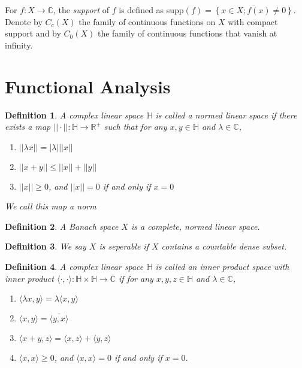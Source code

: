 \documentclass[12pt]{report}
\newtheorem{definition}{Definition}
\numberwithin{definition}{section}
\begin{document}
For $ f : X \to \mathbb{C} $, the \textit{support} of $f$ is defined as supp$(f) = \overline{\left\{ x \in X; f(x) \not = 0 \right\}} $.
Denote by $C_{c}(X)$ the family of continuous functions on $X$ with compact support and by $C_{0}(X)$ the family of continuous functions that vanish at infinity.


\break



\section{Functional Analysis}

\begin{definition}
A complex linear space $\mathbb{H}$ is called a \textit{normed linear space} if there exists a map $|| \cdot || : \mathbb{H} \to \mathbb{R}^{+} $ such that for any $x, y \in \mathbb{H}$ and $ \lambda \in \mathbb{C}$,

\begin{enumerate}
  \item $|| \lambda x || = |\lambda| || x ||$
  \item $|| x + y || \leq || x || + || y ||  $
  \item $|| x || \geq 0$, and $|| x || = 0$ if and only if $x = 0$
\end{enumerate}

We call this map a norm
\end{definition}

\begin{definition}
  A Banach space $X$ is a complete, normed linear space.
\end{definition}

\begin{definition}
  We say $X$ is seperable if $X$ contains a countable dense subset.
\end{definition}

\begin{definition}
  A complex linear space $\mathbb{H}$ is called an inner product space with inner product $ \langle \cdot, \cdot \rangle  : \mathbb{H} \times \mathbb{H} \to \mathbb{C} $ if for any $x,y,z \in \mathbb{H}$ and $\lambda \in \mathbb{C}$,
  \begin{enumerate}
    \item $ \langle \lambda x, y \rangle = \lambda \langle x, y \rangle  $
    \item $ \langle x,y \rangle = \overline{ \langle y,x \rangle }$
    \item $ \langle x + y, z \rangle = \langle x,z \rangle + \langle y,z \rangle $
    \item $ \langle x,x \rangle \geq 0$, and $ \langle x,x \rangle = 0 $ if and only if $x = 0$.
  \end{enumerate}
\end{definition}
\end{document}
